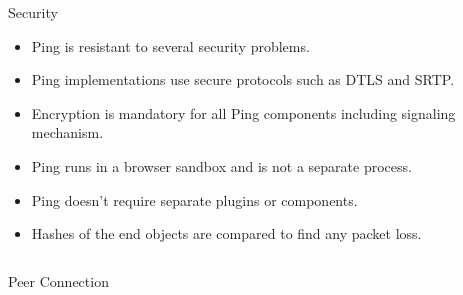 \documentclass[final]{beamer}
\newlength{\onecolwid}
\newlength{\twocolwid}
\begin{document}
\begin{frame}[t]
\begin{columns}[t]
\begin{column}{\twocolwid}
\begin{columns}[t,totalwidth=\twocolwid]
\begin{column}{\onecolwid}
\begin{block}{Security}

\begin{itemize}
\item Ping is resistant to several security problems.
\item Ping implementations use secure protocols such as DTLS and SRTP.
\item Encryption is mandatory for all Ping components including signaling mechanism.
\item Ping runs in a browser sandbox and is not a separate process. 
\item Ping doesn't require separate plugins or components.
\item Hashes of the end objects are compared to find any packet loss.
\end{itemize}

\end{block}


\end{column} %

\end{columns} %





\begin{columns}[t,totalwidth=\twocolwid] %

\begin{column}{\onecolwid} %


\begin{block}{Peer Connection}


\end{block}
\end{column}
\end{columns}
\end{column}
\end{columns}
\end{frame}
\end{document}

